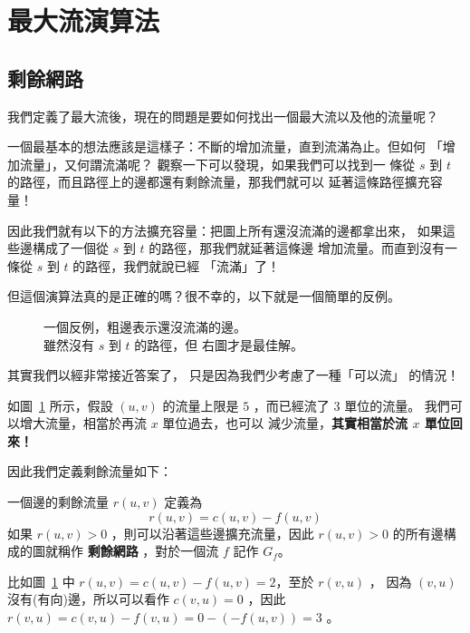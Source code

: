 \documentclass[a4paper,12pt]{book}
\begin{document}
\section{最大流演算法}
\subsection{剩餘網路}
我們定義了最大流後，現在的問題是要如何找出一個最大流以及他的流量呢？

一個最基本的想法應該是這樣子：不斷的增加流量，直到流滿為止。但如何
「增加流量」，又何謂流滿呢？ 觀察一下可以發現，如果我們可以找到一
條從 $s$ 到 $t$ 的路徑，而且路徑上的邊都還有剩餘流量，那我們就可以
延著這條路徑擴充容量！

\begin{figure}[H]
  \centering
  
\end{figure}

因此我們就有以下的方法擴充容量：把圖上所有還沒流滿的邊都拿出來，
如果這些邊構成了一個從 $s$ 到 $t$ 的路徑，那我們就延著這條邊
增加流量。而直到沒有一條從 $s$ 到 $t$ 的路徑，我們就說已經
「流滿」了！

但這個演算法真的是正確的嗎？很不幸的，以下就是一個簡單的反例。

\begin{figure}[H]
  \centering
  
  \caption{一個反例，粗邊表示還沒流滿的邊。\\雖然沒有 $s$ 到 $t$ 的路徑，但
  右圖才是最佳解。}
\end{figure}

其實我們以經非常接近答案了， 只是因為我們少考慮了一種「可以流」
的情況！

\begin{figure}[H]
  \centering
  
  \caption{}
  \label{fig:flow4}
\end{figure}

如圖~\ref{fig:flow4} 所示，假設 $(u, v)$ 的流量上限是 $5$ ，而已經流了
$3$ 單位的流量。 我們可以增大流量，相當於再流 $x$ 單位過去，也可以
減少流量，{\bf 其實相當於流 $x$ 單位回來！}

因此我們定義剩餘流量如下：

\begin{theorem}[定義]
  一個邊的{剩餘流量} $r(u, v)$ 定義為 \[ r(u, v) = c(u, v) - f(u, v) \]
  如果 $r(u, v) > 0$ ，則可以沿著這些邊擴充流量，因此 $r(u, v) > 0$ 
  的所有邊構成的圖就稱作 {\bf 剩餘網路} ，對於一個流 $f$ 記作 $G_f$。
\end{theorem}
比如圖~\ref{fig:flow4} 中 $r(u, v) = c(u, v) - f(u, v) = 2$，至於 $r(v, u)$ ，
因為 $(v, u)$ 沒有(有向)邊，所以可以看作 $c(v, u) = 0$ ，因此 $r(v, u) = 
c(v, u) - f(v, u) = 0 - (- f(u, v)) = 3$ 。
\end{document}
